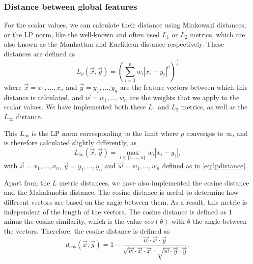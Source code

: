 \subsubsection{Distance between global features}\label{subsubsec:scalar_distance}
For the scalar values, we can calculate their distance using Minkowski distances, or the LP norm, like the well-known
and often used $L_1$ or $L_2$ metrics, which are also known as the Manhattan and Euclidean distance respectively.
These distances are defined as
\begin{equation}
    L_p(\overrightarrow{x}, \overrightarrow{y}) = \left( \sum_{i = 1}^n w_i \left| x_i - y_i \right|^p \right)^\frac{1}{p}\label{eq:lpdistance}
\end{equation}
where $\overrightarrow{x} = {x_1, \dots, x_n}$ and $\overrightarrow{y} = {y_1, \dots, y_n}$ are the feature vectors between which this distance is calculated, and $\overrightarrow{w} = {w_1, \dots, w_n}$ are the weights that we apply to the scalar values.
We have implemented both these $L_1$ and $L_2$ metrics, as well as the $L_{\infty}$ distance.

This $L_{\infty}$ is the LP norm corresponding to the limit where $p$ converges to $\infty$, and is therefore
calculated slightly differently, as
\begin{equation}
    L_{\infty}(\overrightarrow{x}, \overrightarrow{y}) =  \max\limits_{i \in \{
    1, \dots, n\}} w_i \left| x_i - y_i \right|,
\end{equation}
with $\overrightarrow{x} = {x_1, \dots, x_n}$, $\overrightarrow{y} = {y_1, \dots, y_n}$ and $\overrightarrow{w} = {w_1, \dots, w_n}$ defined as in \ref{eq:lpdistance}.

Apart from the $L$ metric distances, we have also implemented the cosine distance and the Mahalanobis distance.
The cosine distance is useful to determine how different vectors are based on the angle between them.
As a result, this metric is independent of the length of the vectors.
The cosine distance is defined as $1$ minus the cosine similarity, which is the value $cos(\theta)$ with $\theta$ the angle between the vectors.
Therefore, the cosine distance is defined as
\begin{equation}
    d_{cos}(\overrightarrow{x}, \overrightarrow{y}) = 1 - \frac{\overrightarrow{w} \cdot\overrightarrow{x} \cdot \overrightarrow{y}}{\sqrt{\overrightarrow{w} \cdot\overrightarrow{x} \cdot \overrightarrow{x}} \cdot \sqrt{\overrightarrow{w} \cdot\overrightarrow{y} \cdot \overrightarrow{y}}}.
\end{equation}

